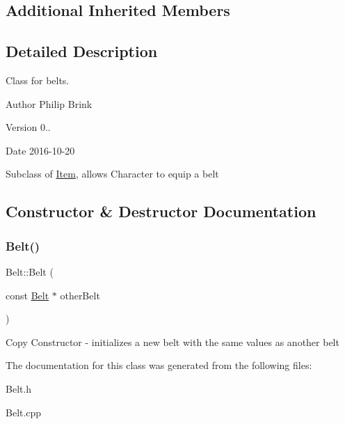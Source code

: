 \subsection*{Additional Inherited Members}


\subsection{Detailed Description}
Class for belts. 

\begin{DoxyAuthor}{Author}
Philip Brink 
\end{DoxyAuthor}
\begin{DoxyVersion}{Version}
0.. 
\end{DoxyVersion}
\begin{DoxyDate}{Date}
2016-\/10-\/20
\end{DoxyDate}
Subclass of \hyperlink{class_item}{Item}, allows Character to equip a belt 

\subsection{Constructor \& Destructor Documentation}
\hypertarget{class_belt_a0fe7148ac3d4fba7953f89cd1ca00443}{}\label{class_belt_a0fe7148ac3d4fba7953f89cd1ca00443} 
\subsubsection{\texorpdfstring{Belt()}{Belt()}}
{\footnotesize\ttfamily Belt\+::\+Belt (\begin{DoxyParamCaption}\item[{const \hyperlink{class_belt}{Belt} $\ast$}]{other\+Belt }\end{DoxyParamCaption})}

Copy Constructor -\/ initializes a new belt with the same values as another belt 

The documentation for this class was generated from the following files\+:\begin{DoxyCompactItemize}
\item 
Belt.\+h\item 
Belt.\+cpp\end{DoxyCompactItemize}
